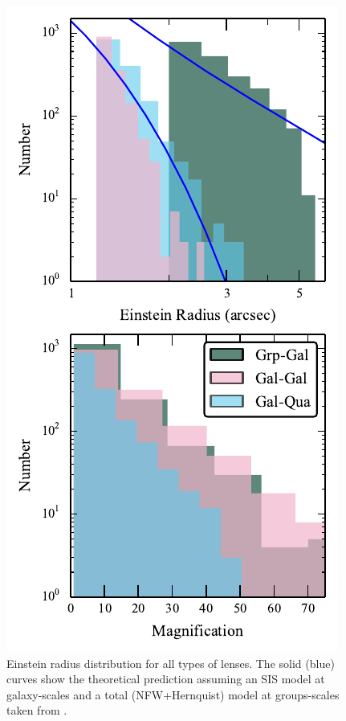 \documentclass[useAMS,usenatbib,a4paper]{mn2e}
\begin{document}
\begin{figure}
\begin{center}
\includegraphics[scale=1.2]{sw-cfhtls-figs/distrib_remu.pdf}
\caption{ \label{fig:remudist}
Einstein radius distribution for all types of lenses. The solid (blue)
curves show the theoretical prediction assuming an SIS model at galaxy-scales
and a total (NFW+Hernquist) model at groups-scales taken from \citep{More2012}.
}
\end{center}
\end{figure}
\end{document}
